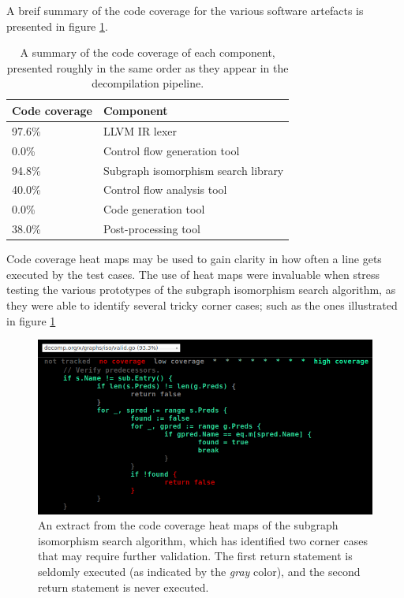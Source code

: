 A breif summary of the code coverage for the various software artefacts is presented in figure \ref{tbl:code_coverage_summary}.

\begin{table}[htbp]
	\begin{center}
		\begin{tabular}{|l|l|}
			\hline
			Code coverage & Component \\
			\hline
			97.6\% & LLVM IR lexer \\
			0.0\% & Control flow generation tool \\
			94.8\% & Subgraph isomorphism search library \\
			40.0\% & Control flow analysis tool \\
			0.0\% & Code generation tool \\
			38.0\% & Post-processing tool \\
			\hline
		\end{tabular}
	\end{center}
	\caption{A summary of the code coverage of each component, presented roughly in the same order as they appear in the decompilation pipeline.}
	\label{tbl:code_coverage_summary}
\end{table}

Code coverage heat maps may be used to gain clarity in how often a line gets executed by the test cases. The use of heat maps were invaluable when stress testing the various prototypes of the subgraph isomorphism search algorithm, as they were able to identify several tricky corner cases; such as the ones illustrated in figure \ref{fig:iso_heat_map}

\begin{figure}[htbp]
	\begin{center}
		\includegraphics[width=\textwidth]{inc/8_ver/iso_heat_map.png}
		\caption{An extract from the code coverage heat maps of the subgraph isomorphism search algorithm, which has identified two corner cases that may require further validation. The first return statement is seldomly executed (as indicated by the \textit{gray} color), and the second return statement is never executed.}
		\label{fig:iso_heat_map}
	\end{center}
\end{figure}
